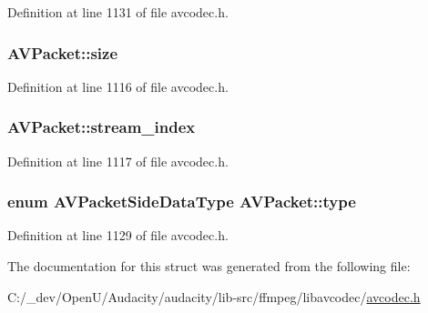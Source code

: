 Definition at line 1131 of file avcodec.\+h.

\subsubsection[{\texorpdfstring{size}{size}}]{ A\+V\+Packet\+::size}\hypertarget{struct_a_v_packet_a4d1ea19f63eb107111fd650ca514d1f4}{}\label{struct_a_v_packet_a4d1ea19f63eb107111fd650ca514d1f4}


Definition at line 1116 of file avcodec.\+h.

\subsubsection[{\texorpdfstring{stream\+\_\+index}{stream_index}}]{ A\+V\+Packet\+::stream\+\_\+index}\hypertarget{struct_a_v_packet_a0d1cb9b5a32b00fb6edc81ea3aae2a49}{}\label{struct_a_v_packet_a0d1cb9b5a32b00fb6edc81ea3aae2a49}


Definition at line 1117 of file avcodec.\+h.

\subsubsection[{\texorpdfstring{type}{type}}]{\setlength{\rightskip}{0pt plus 5cm}enum {\bf A\+V\+Packet\+Side\+Data\+Type} A\+V\+Packet\+::type}\hypertarget{struct_a_v_packet_a01690f0be58299b32a1c37fb849ae724}{}\label{struct_a_v_packet_a01690f0be58299b32a1c37fb849ae724}


Definition at line 1129 of file avcodec.\+h.



The documentation for this struct was generated from the following file\+:\begin{DoxyCompactItemize}
\item 
C\+:/\+\_\+dev/\+Open\+U/\+Audacity/audacity/lib-\/src/ffmpeg/libavcodec/\hyperlink{avcodec_8h}{avcodec.\+h}\end{DoxyCompactItemize}
